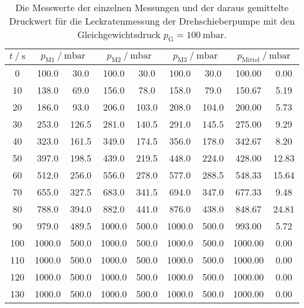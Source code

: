     \begin{table}[h]
      \centering
      \caption{Die Messwerte der einzelnen Messungen und der daraus gemittelte Druckwert für die Leckratenmessung der Drehschieberpumpe mit den 
      Gleichgewichtsdruck $p_\text{G} = \SI{100}{\milli\bar}$.}
      \label{tab:dreh_leck_100}
      \begin{tabular}{S[table-format=3.0] S @{${}\pm{}$} S[table-format=3.2] S @{${}\pm{}$} S[table-format=3.2] S @{${}\pm{}$} S[table-format=3.2] S[table-format=4.2] @{${}\pm{}$} S[table-format=2.2]}
      \toprule
      {$t \mathbin{/} \si{\second} $} &  &  &  &  \\
       &  100.0 &  30.0 &  100.0 &  30.0 &  100.0 &  30.0 &  100.00 &  0.00 \\  
       10 &  138.0 &  69.0 &  156.0 &  78.0 &  158.0 &  79.0 &  150.67 &  5.19 \\
       20 &  186.0 &  93.0 &  206.0 & 103.0 &  208.0 & 104.0 &  200.00 &  5.73 \\
       30 &  253.0 & 126.5 &  281.0 & 140.5 &  291.0 & 145.5 &  275.00 &  9.29 \\
       40 &  323.0 & 161.5 &  349.0 & 174.5 &  356.0 & 178.0 &  342.67 &  8.20 \\
       50 &  397.0 & 198.5 &  439.0 & 219.5 &  448.0 & 224.0 &  428.00 & 12.83 \\
       60 &  512.0 & 256.0 &  556.0 & 278.0 &  577.0 & 288.5 &  548.33 & 15.64 \\
       70 &  655.0 & 327.5 &  683.0 & 341.5 &  694.0 & 347.0 &  677.33 &  9.48 \\
       80 &  788.0 & 394.0 &  882.0 & 441.0 &  876.0 & 438.0 &  848.67 & 24.81 \\
       90 &  979.0 & 489.5 & 1000.0 & 500.0 & 1000.0 & 500.0 &  993.00 &  5.72 \\
      100 & 1000.0 & 500.0 & 1000.0 & 500.0 & 1000.0 & 500.0 & 1000.00 &  0.00 \\
      110 & 1000.0 & 500.0 & 1000.0 & 500.0 & 1000.0 & 500.0 & 1000.00 &  0.00 \\
      120 & 1000.0 & 500.0 & 1000.0 & 500.0 & 1000.0 & 500.0 & 1000.00 &  0.00 \\
      130 & 1000.0 & 500.0 & 1000.0 & 500.0 & 1000.0 & 500.0 & 1000.00 &  0.00 \\

\end{tabular}
\end{table}
